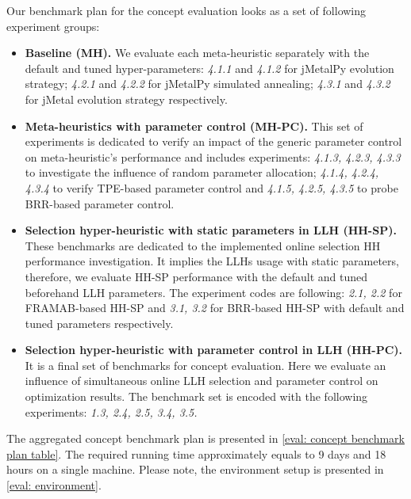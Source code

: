 Our benchmark plan for the concept evaluation looks as a set of following experiment groups:
\begin{itemize}
	\item \textbf{Baseline (MH).} We evaluate each meta-heuristic separately with the default and tuned hyper-parameters: \emph{4.1.1} and \emph{4.1.2} for jMetalPy evolution strategy;  \emph{4.2.1} and \emph{4.2.2} for jMetalPy simulated annealing; \emph{4.3.1} and \emph{4.3.2} for jMetal evolution strategy respectively.

	\item \textbf{Meta-heuristics with parameter control (MH-PC).} This set of experiments is dedicated to verify an impact of the generic parameter control on meta-heuristic's performance and includes experiments: \emph{4.1.3, 4.2.3, 4.3.3} to investigate the influence of random parameter allocation; \emph{4.1.4, 4.2.4, 4.3.4} to verify TPE-based parameter control and \emph{4.1.5, 4.2.5, 4.3.5} to probe BRR-based parameter control.

	\item \textbf{Selection hyper-heuristic with static parameters in LLH (HH-SP).} These benchmarks are dedicated to the implemented online selection HH performance investigation. It implies the LLHs usage with static parameters, therefore, we evaluate HH-SP performance with the default and tuned beforehand LLH parameters. The experiment codes are following: \emph{2.1, 2.2} for FRAMAB-based HH-SP and \emph{3.1, 3.2} for BRR-based HH-SP with default and tuned parameters respectively.
	
	\item \textbf{Selection hyper-heuristic with parameter control in LLH (HH-PC).} It is a final set of benchmarks for concept evaluation. Here we evaluate an influence of simultaneous online LLH selection and parameter control on optimization results. The benchmark set is encoded with the following experiments: \emph{1.3, 2.4, 2.5, 3.4, 3.5.}
\end{itemize}

The aggregated concept benchmark plan is presented in \cref{eval: concept benchmark plan table}. The required running time approximately equals to 9 days and 18 hours on a single machine. Please note, the environment setup is presented in \cref{eval: environment}.

